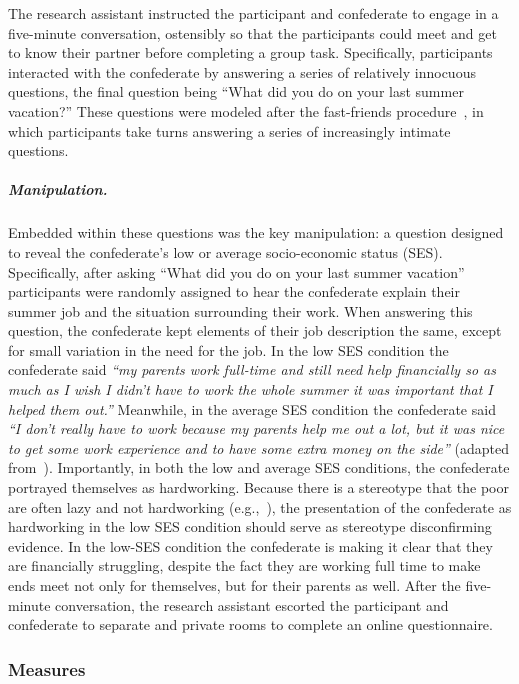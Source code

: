 \documentclass{sfuthesis}
\begin{document}
The research assistant instructed the participant and confederate to engage in a five-minute conversation, ostensibly so that the participants could meet and get to know their partner before completing a group task. Specifically, participants interacted with the confederate by answering a series of relatively innocuous questions, the final question being “What did you do on your last summer vacation?” These questions were modeled after the fast-friends procedure~\cite{aron97}, in which participants take turns answering a series of increasingly intimate questions.
	
\subparagraph{Manipulation.} Embedded within these questions was the key manipulation: a question designed to reveal the confederate’s low or average socio-economic status (SES). Specifically, after asking “What did you do on your last summer vacation” participants were randomly assigned to hear the confederate explain their summer job and the situation surrounding their work. When answering this question, the confederate kept elements of their job description the same, except for small variation in the need for the job. In the low SES condition the confederate said \textit{“my parents work full-time and still need help financially so as much as I wish I didn’t have to work the whole summer it was important that I helped them out.”} Meanwhile, in the average SES condition the confederate said \textit{“I don’t really have to work because my parents help me out a lot, but it was nice to get some work experience and to have some extra money on the side”} (adapted from~\cite{horbergunpub}). Importantly, in both the low and average SES conditions, the confederate portrayed themselves as hardworking. Because there is a stereotype that the poor are often lazy and not hardworking (e.g.,~\cite{cozzarelli01}), the presentation of the confederate as hardworking in the low SES condition should serve as stereotype disconfirming evidence. In the low-SES condition the confederate is making it clear that they are financially struggling, despite the fact they are working full time to make ends meet not only for themselves, but for their parents as well. After the five-minute conversation, the research assistant escorted the participant and confederate to separate and private rooms to complete an online questionnaire.

\subsubsection{Measures}
\end{document}
